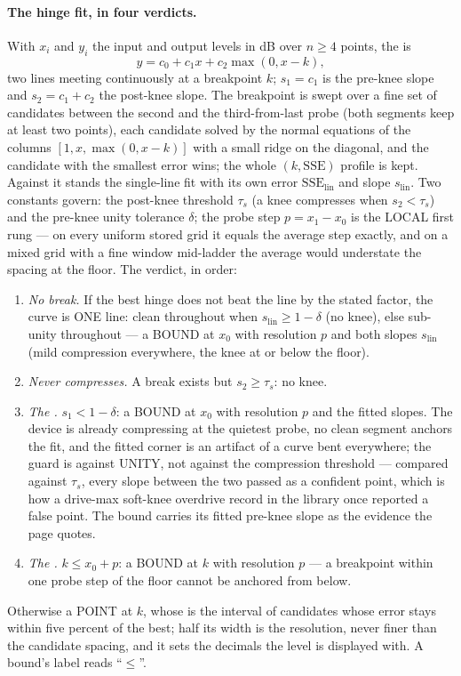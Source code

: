 \documentclass[11pt,a4paper]{article}
\begin{document}
\paragraph{The hinge fit, in four verdicts.}
With $x_i$ and $y_i$ the input and output levels in dB over $n \ge 4$
points, the  is
\begin{equation}
  y = c_0 + c_1 x + c_2 \max(0, x - k),
  \label{eq:hinge}
\end{equation}
two lines meeting continuously at a breakpoint $k$; $s_1 = c_1$ is the
pre-knee slope and $s_2 = c_1 + c_2$ the post-knee slope. The breakpoint
is swept over a fine set of candidates between the second and the
third-from-last probe (both segments keep at least two points), each
candidate solved by the normal equations of the columns $[1, x,
\max(0, x-k)]$ with a small ridge on the diagonal, and the candidate with
the smallest error wins; the whole $(k, \mathrm{SSE})$ profile is kept.
Against it stands the single-line fit with its own error
$\mathrm{SSE}_{\mathrm{lin}}$ and slope $s_{\mathrm{lin}}$. Two constants
govern: the post-knee threshold $\tau_s$ (a knee compresses when
$s_2 < \tau_s$) and the pre-knee unity tolerance $\delta$; the probe step
$p = x_1 - x_0$ is the LOCAL first rung --- on every uniform stored grid
it equals the average step exactly, and on a mixed grid with a fine
window mid-ladder the average would understate the spacing at the floor.
The verdict, in order:
\begin{enumerate}
  \item \emph{No break.} If the best hinge does not beat the line by the
  stated factor, the curve is ONE line: clean throughout when
  $s_{\mathrm{lin}} \ge 1 - \delta$ (no knee), else sub-unity throughout
  --- a BOUND at $x_0$ with resolution $p$ and both slopes
  $s_{\mathrm{lin}}$ (mild compression everywhere, the knee at or below
  the floor).
  \item \emph{Never compresses.} A break exists but $s_2 \ge \tau_s$: no
  knee.
  \item \emph{The .} $s_1 < 1 - \delta$: a BOUND at
  $x_0$ with resolution $p$ and the fitted slopes. The device is already
  compressing at the quietest probe, no clean segment anchors the fit,
  and the fitted corner is an artifact of a curve bent everywhere; the
  guard is against UNITY, not against the compression threshold ---
  compared against $\tau_s$, every slope between the two passed as a
  confident point, which is how a drive-max soft-knee overdrive record in
  the library once reported a false point. The bound carries its fitted
  pre-knee slope as the evidence the page quotes.
  \item \emph{The .} $k \le x_0 + p$: a BOUND at $k$
  with resolution $p$ --- a breakpoint within one probe step of the floor
  cannot be anchored from below.
\end{enumerate}
Otherwise a POINT at $k$, whose  is the interval of
candidates whose error stays within five percent of the best; half its
width is the resolution, never finer than the candidate spacing, and it
sets the decimals the level is displayed with. A bound's label reads
``$\le$''.
\end{document}
